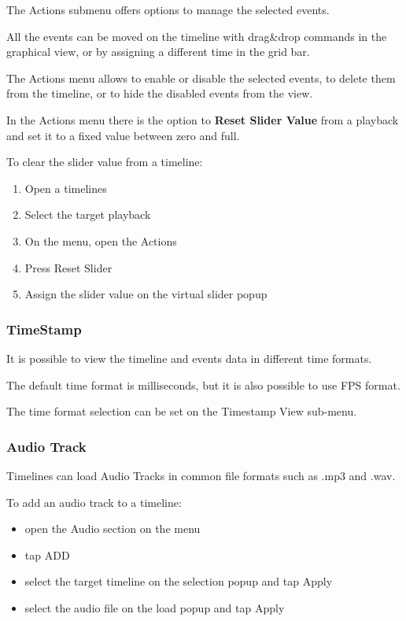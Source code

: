 \documentclass[
]{article}
\begin{document}
The Actions submenu offers options to manage the selected events.

All the events can be moved on the timeline with drag\&drop commands in the graphical view, or by assigning a different time in the grid bar.

The Actions menu allows to enable or disable the selected events, to delete them from the timeline, or to hide the disabled events from the view.

In the Actions menu there is the option to \textbf{Reset Slider Value} from a playback and set it to a fixed value between zero and full.

To clear the slider value from a timeline:

\begin{enumerate}
\def\labelenumi{\arabic{enumi}.}
\item
  Open a timelines
\item
  Select the target playback
\item
  On the menu, open the Actions
\item
  Press Reset Slider
\item
  Assign the slider value on the virtual slider popup
\end{enumerate}

\hypertarget{timestamp}{%
\subsubsection{TimeStamp}\label{timestamp}}

It is possible to view the timeline and events data in different time formats.

The default time format is milliseconds, but it is also possible to use FPS format.

The time format selection can be set on the Timestamp View sub-menu.

\hypertarget{audio-track}{%
\subsubsection{Audio Track}\label{audio-track}}

Timelines can load Audio Tracks in common file formats such as .mp3 and .wav.

To add an audio track to a timeline:

\begin{itemize}
\item
  open the Audio section on the menu
\item
  tap ADD
\item
  select the target timeline on the selection popup and tap Apply
\item
  select the audio file on the load popup and tap Apply
\end{itemize}
\end{document}

